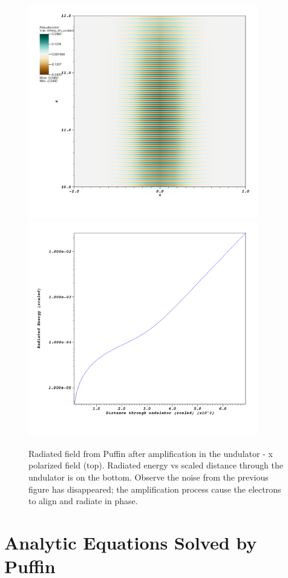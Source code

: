 \documentclass[12pt]{article}%
\begin{document}
\begin{figure}
\centering
\includegraphics[width=100mm]{visit0036.png}
\includegraphics[width=100mm]{visit0037.png}
\caption{Radiated field from Puffin after amplification in the undulator - x polarized field (top). Radiated energy vs scaled distance through the undulator is on the bottom. Observe the noise from the previous figure has disappeared; the amplification process cause the electrons to align and radiate in phase.  }
\label{bbd2}
\end{figure}

\newpage

\section{Analytic Equations Solved by Puffin}
\end{document}
